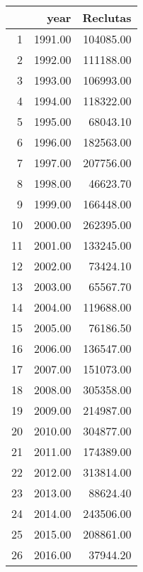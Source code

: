 \begin{table}[ht]
\centering
\begin{tabular}{rrr}
  \hline
 & year & Reclutas \\ 
  \hline
1 & 1991.00 & 104085.00 \\ 
  2 & 1992.00 & 111188.00 \\ 
  3 & 1993.00 & 106993.00 \\ 
  4 & 1994.00 & 118322.00 \\ 
  5 & 1995.00 & 68043.10 \\ 
  6 & 1996.00 & 182563.00 \\ 
  7 & 1997.00 & 207756.00 \\ 
  8 & 1998.00 & 46623.70 \\ 
  9 & 1999.00 & 166448.00 \\ 
  10 & 2000.00 & 262395.00 \\ 
  11 & 2001.00 & 133245.00 \\ 
  12 & 2002.00 & 73424.10 \\ 
  13 & 2003.00 & 65567.70 \\ 
  14 & 2004.00 & 119688.00 \\ 
  15 & 2005.00 & 76186.50 \\ 
  16 & 2006.00 & 136547.00 \\ 
  17 & 2007.00 & 151073.00 \\ 
  18 & 2008.00 & 305358.00 \\ 
  19 & 2009.00 & 214987.00 \\ 
  20 & 2010.00 & 304877.00 \\ 
  21 & 2011.00 & 174389.00 \\ 
  22 & 2012.00 & 313814.00 \\ 
  23 & 2013.00 & 88624.40 \\ 
  24 & 2014.00 & 243506.00 \\ 
  25 & 2015.00 & 208861.00 \\ 
  26 & 2016.00 & 37944.20 \\ 
   \hline
\end{tabular}
\end{table}
